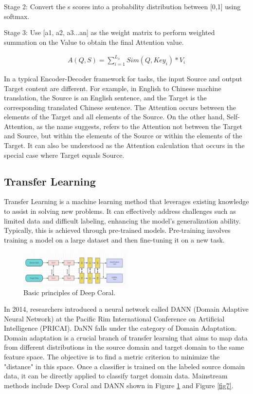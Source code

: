 \documentclass[10pt,twocolumn,letterpaper]{article}
\begin{document}
Stage 2: Convert the s scores into a probability distribution between [0,1] using softmax.

Stage 3: Use [a1, a2, a3...an] as the weight matrix to perform weighted summation on the Value to obtain the final Attention value.

\begin{eqnarray}
  A(Q,S)=\sum^{L_x}_{i=1}Sim(Q,Key_i)*V_i
\end{eqnarray}

In a typical Encoder-Decoder framework for tasks, the input Source and output Target content are different. For example, in English to Chinese machine translation, the Source is an English sentence, and the Target is the corresponding translated Chinese sentence. The Attention  occurs between the elements of the Target and all elements of the Source. On the other hand, Self-Attention, as the name suggests, refers to the Attention  not between the Target and Source, but within the elements of the Source or within the elements of the Target. It can also be understood as the Attention calculation  that occurs in the special case where Target equals Source.

\subsection{Transfer Learning}

Transfer Learning is a machine learning method that leverages existing knowledge to assist in solving new problems. It can effectively address challenges such as limited data and difficult labeling, enhancing the model's generalization ability. Typically, this is achieved through pre-trained models. Pre-training involves training a model on a large dataset and then fine-tuning it on a new task.
\begin{figure}
  \centering %
  \includegraphics[width=0.5\textwidth]{image6.png} %
  \caption{Basic principles of Deep Coral.} %
  \label{fig6}
\end{figure}

In 2014, researchers introduced a neural network called DANN (Domain Adaptive Neural Network) at the Pacific Rim International Conference on Artificial Intelligence (PRICAI). DaNN falls under the category of Domain Adaptation. Domain adaptation is a crucial branch of transfer learning that aims to map data from different distributions in the source domain and target domain to the same feature space. The objective is to find a metric criterion to minimize the "distance" in this space. Once a classifier is trained on the labeled source domain data, it can be directly applied to classify target domain data. Mainstream methods include Deep Coral and DANN shown in Figure \ref{fig6} and Figure \ref{fig7}.
\end{document}
